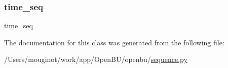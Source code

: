 \subsubsection{\texorpdfstring{time\+\_\+seq}{time\_seq}}
{\footnotesize\ttfamily time\+\_\+seq}



The documentation for this class was generated from the following file\+:\begin{DoxyCompactItemize}
\item 
/\+Users/mouginot/work/app/\+Open\+B\+U/openbu/\mbox{\hyperlink{sequence_8py}{sequence.\+py}}\end{DoxyCompactItemize}
